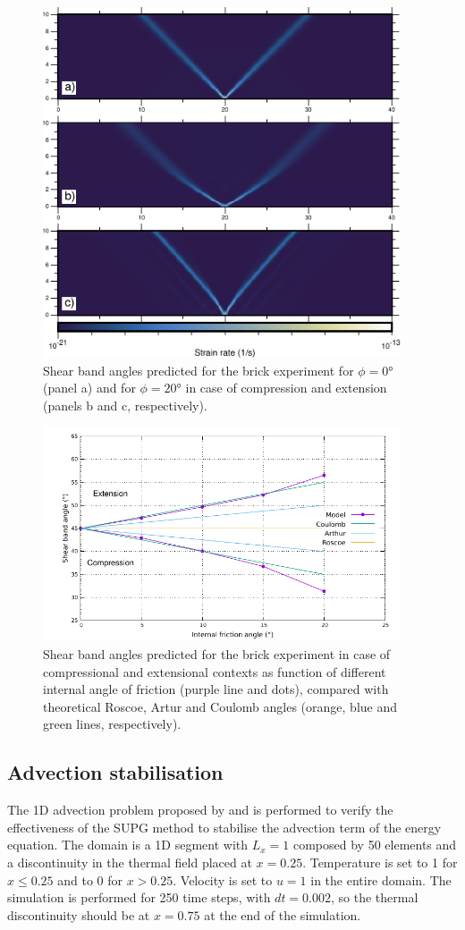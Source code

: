 \documentclass[hidelinks,11pt,a4paper]{article}
\begin{document}
\begin{figure}
\centering
\noindent\includegraphics[width=400px]{./Figures/Brick_Beam.pdf}
\caption{Shear band angles predicted for the brick experiment for $\phi=0$° (panel a) and for $\phi=20$° in case of compression and extension (panels b and c, respectively).}
\label{fig:brick_beam}
\end{figure}

\begin{figure}
\centering
\noindent\includegraphics[width=400px]{./Figures/Brick.pdf}
\caption{Shear band angles predicted for the brick experiment in case of compressional and extensional contexts as function of different internal angle of friction (purple line and dots), compared with theoretical Roscoe, Artur and Coulomb angles (orange, blue and green lines, respectively).}
\label{fig:brick}
\end{figure}

\subsection{Advection stabilisation}\label{sec:advection}
The 1D advection problem proposed by \citet{Donea2003} and \citet{Thieulot2011} is performed to verify the effectiveness of the SUPG method to stabilise the advection term of the energy equation. The domain is a 1D segment with $L_x=1$ composed by 50 elements and a discontinuity in the thermal field placed at $x=0.25$. Temperature is set to 1 for $x \leq 0.25$ and to 0 for $x > 0.25$. Velocity is set to ${u}=1$ in the entire domain. The simulation is performed for 250 time steps, with $dt=0.002$, so the thermal discontinuity should be at $x=0.75$ at the end of the simulation.
\end{document}
